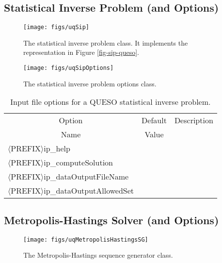 \subsection{Statistical Inverse Problem (and Options)}

\begin{figure}[h!]
\centerline{
\texttt{[image: figs/uqSip]}
}
\caption{
The statistical inverse problem class. It implements the representation in Figure \ref{fig-sip-queso}.
}
\label{fig-sip-class}
\end{figure}

\begin{figure}[h!]
\begin{center}
\texttt{[image: figs/uqSipOptions]}
\end{center}
\caption{
The statistical inverse problem options class.
}
\label{fig-sip-options-class}
\end{figure}

\begin{table}[!h]
\begin{center}
\begin{tabular}{|l|c|c|}
\hline
\multicolumn{1}{|c|}{Option}                     & Default & Description \\
\multicolumn{1}{|c|}{Name}                       & Value   &             \\
\hline
\hline
$\langle$PREFIX$\rangle$ip\_help                 &         &             \\
\hline
$\langle$PREFIX$\rangle$ip\_computeSolution      &         &             \\
\hline
$\langle$PREFIX$\rangle$ip\_dataOutputFileName   &         &             \\
\hline
$\langle$PREFIX$\rangle$ip\_dataOutputAllowedSet &         &             \\
\hline
\end{tabular}
\end{center}
\caption{
Input file options for a QUESO statistical inverse problem.
}
\label{tab-sip-options}
\end{table}

\subsection{Metropolis-Hastings Solver (and Options)}

\begin{figure}[h!]
\centerline{
\texttt{[image: figs/uqMetropolisHastingsSG]}
}
\caption{
The Metropolis-Hastings sequence generator class.
}
\label{fig-metropolis-hastings-solver-class}
\end{figure}

